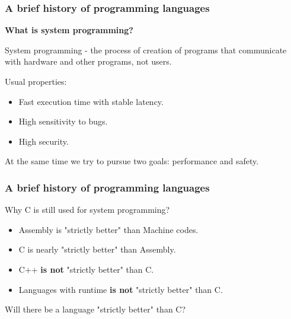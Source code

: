 \documentclass[aspectratio=1610,t]{beamer}
\begin{document}

\begin{frame}
\frametitle{A brief history of programming languages}
\textbf{What is system programming?}

System programming - the process of creation of programs that communicate with hardware and other programs, not users.

Usual properties:
\begin{itemize}
    \item Fast execution time with stable latency.
    \item High sensitivity to bugs.
    \item High security.
\end{itemize}

At the same time we try to pursue two goals: performance and safety.
\end{frame}


\begin{frame}
\frametitle{A brief history of programming languages}
Why C is still used for system programming?

\begin{itemize}
    \item Assembly is "strictly better" than Machine codes.
    \item C is nearly "strictly better" than Assembly.
    \item C++ \textbf{is not} "strictly better" than C.
    \item Languages with runtime \textbf{is not} "strictly better" than C.
\end{itemize}

Will there be a language "strictly better" than C?
\end{frame}

\end{document}
